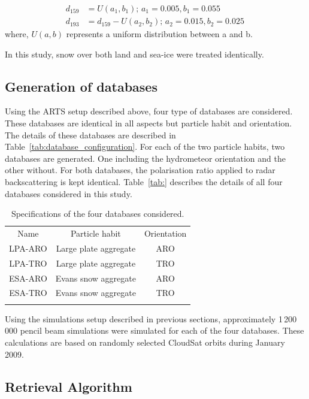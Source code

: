 \documentclass[amt, manuscript]{copernicus}
\begin{document}
\begin{align}
d_{159}& = U(a_1, b_1) ;\, a_1 = 0.005, b_1 = 0.055\\
d_{193}& = d_{159} - U(a_2, b_2) ;\, a_2 = 0.015, b_2 = 0.025 \,
\end{align}
where, $U(a, b)$ represents a uniform distribution between a and b. 

In this study, snow over both land and sea-ice were treated identically.  

\subsection{Generation of databases}
\label{sec:database}

Using the ARTS setup described above, four type of databases are considered. These databases are identical in all aspects but particle habit and orientation. The details of these databases are described in Table~\ref{tab:database_configuration}. For each of the two particle habits, two databases are generated. One including the hydrometeor orientation and the other without. For both databases, the polarisation ratio applied to radar backscattering is kept identical. Table~\ref{tab:} describes the details of all four databases considered in this study.

\begin{table}[t]
	\caption{Specifications of the four databases considered.}
	\label{tab:specs_database}	
	\begin{tabular}{ccc}
		\tophline
		Name & Particle habit 	& Orientation  \\
		\middlehline
		LPA-ARO & Large plate aggregate & ARO\\
		LPA-TRO & Large plate aggregate & TRO\\
		ESA-ARO & Evans snow aggregate  & ARO\\
	    ESA-TRO & Evans snow aggregate  & TRO\\
		\bottomhline
	\end{tabular}
	\belowtable{} %
\end{table}

Using the simulations setup described in previous sections, approximately 1\,200\,000 pencil beam simulations were simulated for each of the four databases. These calculations are based on randomly selected CloudSat orbits during January 2009.



\subsection{Retrieval Algorithm}
\label{sec:retrieval_algo}
\end{document}
